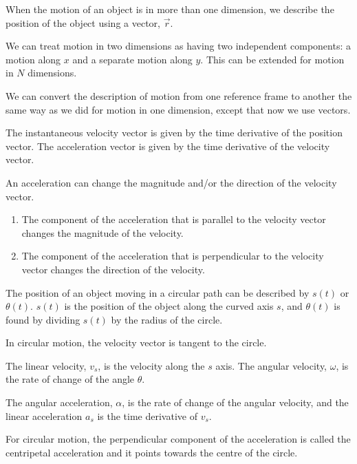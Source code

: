 \begin{chapterSummary}{
\item When the motion of an object is in more than one dimension, we describe the position of the object using a vector, $\vec{r}$.

\item We can treat motion in two dimensions as having two independent components: a motion along $x$ and  a separate motion along $y$. This can be extended for motion in $N$ dimensions.

\item We can convert the description of motion from one reference frame to another the same way as we did for motion in one dimension, except that now we use vectors.

\item The instantaneous velocity vector is given by the time derivative of the position vector. The acceleration vector is given by the time derivative of the velocity vector.
\item An acceleration can change the magnitude and/or the direction of the velocity vector.
\begin{enumerate}
\item The component of the acceleration that is parallel to the velocity vector changes the magnitude of the velocity.
\item The component of the acceleration that is perpendicular to the velocity vector changes the direction of the velocity.
\end{enumerate}

\item The position of an object moving in a circular path can be described by $s(t)$ or $\theta (t)$. $s(t)$ is the position of the object along the curved axis $s$, and $\theta (t)$ is found by dividing $s(t)$ by the radius of the circle.

\item In circular motion, the velocity vector is tangent to the circle.

\item The linear velocity, $v_s$, is the velocity along the $s$ axis. The angular velocity, $\omega$, is the rate of change of the angle $\theta$. 

\item The angular acceleration, $\alpha$, is the rate of change of the angular velocity, and the linear acceleration $a_s$ is the time derivative of $v_s$.

\item For circular motion, the perpendicular component of the acceleration is called the centripetal acceleration and it points towards the centre of the circle.

}
\end{chapterSummary}
